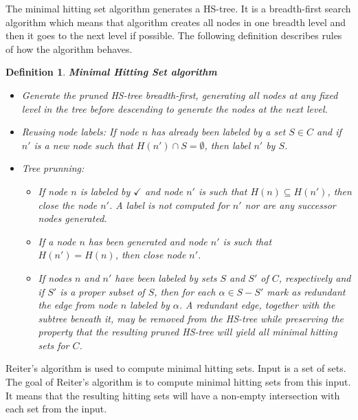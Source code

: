 \documentclass[12pt,a4paper]{article}
\newtheorem{definition}{Definition}[subsection]
\begin{document}
The minimal hitting set algorithm generates a HS-tree. It is a breadth-first search algorithm which means that algorithm creates all nodes in one breadth level and then it goes to the next level if possible. The following definition describes rules of how the algorithm behaves.

\begin{definition}{\textbf{Minimal Hitting Set algorithm}}{\indent}
	\begin{itemize}
		\item Generate the pruned HS-tree breadth-first, generating all nodes at any fixed level in the tree before descending to generate the nodes at the next level.
		
		\item Reusing node labels: If node $n$ has already been labeled by a set $S \in C$ and if $n'$ is a new node such that $H(n') \cap S = \emptyset$, then label $n'$ by $S$.
		
		\item Tree prunning:
		
		\begin{itemize}
			\item If node $n$ is labeled by $\checkmark$ and node $n'$ is such that $H(n) \subseteq H(n')$, then close the node $n'$. A label is not computed for $n'$ nor are any successor nodes generated.
			
			\item If a node $n$ has been generated and node $n'$ is such that $H(n') = H(n)$, then close node $n'$.
			
			\item If nodes $n$ and $n'$ have been labeled by sets $S$ and $S'$ of $C$, respectively and if $S'$ is a proper subset of $S$, then for each $\alpha \in S - S'$ mark as redundant the edge from node $n$ labeled by $\alpha$. A redundant edge, together with the subtree beneath it, may be removed from the HS-tree while preserving the property that the resulting pruned HS-tree will yield all minimal hitting sets for $C$.
			
		\end{itemize}	
		
	\end{itemize}
	
\end{definition}

Reiter's algorithm is used to compute minimal hitting sets. Input is a set of sets. The goal of Reiter's algorithm is to compute minimal hitting sets from this input. It means that the resulting hitting sets will have a non-empty intersection with each set from the input.
\end{document}

